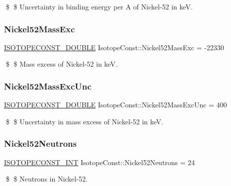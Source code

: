 \$ \$ Uncertainty in binding energy per A of Nickel-\/52 in keV. \mbox{\label{group___isotope_const-_nickel-_ni52_gada5faa9fdf45e247d8018020057e937f}} 
\subsubsection{\texorpdfstring{Nickel52\+Mass\+Exc}{Nickel52MassExc}}
{\footnotesize\ttfamily \mbox{\hyperlink{group___isotope_const-_macros_ga8f45a7272ce02c0b4c65c44636ed719a}{I\+S\+O\+T\+O\+P\+E\+C\+O\+N\+S\+T\+\_\+\+D\+O\+U\+B\+LE}} Isotope\+Const\+::\+Nickel52\+Mass\+Exc = -\/22330}

\$ \$ Mass excess of Nickel-\/52 in keV. \mbox{\label{group___isotope_const-_nickel-_ni52_ga40037dfd1525bc738a462c22b8337b26}} 
\subsubsection{\texorpdfstring{Nickel52\+Mass\+Exc\+Unc}{Nickel52MassExcUnc}}
{\footnotesize\ttfamily \mbox{\hyperlink{group___isotope_const-_macros_ga8f45a7272ce02c0b4c65c44636ed719a}{I\+S\+O\+T\+O\+P\+E\+C\+O\+N\+S\+T\+\_\+\+D\+O\+U\+B\+LE}} Isotope\+Const\+::\+Nickel52\+Mass\+Exc\+Unc = 400}

\$ \$ Uncertainty in mass excess of Nickel-\/52 in keV. \mbox{\label{group___isotope_const-_nickel-_ni52_gafe72559c016f97888d2b35afd0a0a7df}} 
\subsubsection{\texorpdfstring{Nickel52\+Neutrons}{Nickel52Neutrons}}
{\footnotesize\ttfamily \mbox{\hyperlink{group___isotope_const-_macros_ga5f18360b3e99483a35c32d789e62621c}{I\+S\+O\+T\+O\+P\+E\+C\+O\+N\+S\+T\+\_\+\+I\+NT}} Isotope\+Const\+::\+Nickel52\+Neutrons = 24}

\$ \$ Neutrons in Nickel-\/52. \mbox{\label{group___isotope_const-_nickel-_ni52_gac5a830bdfa5b971131331df72d2f60d5}} 
